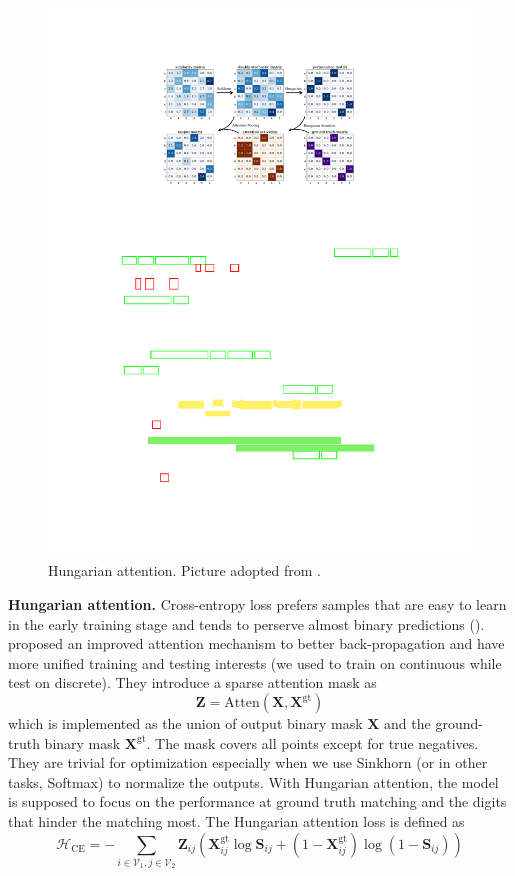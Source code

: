 \documentclass[a4paper]{article}
\begin{document}
\begin{figure}[htbp]
    \centering
    \includegraphics[width=0.5\linewidth]{Images/hungarian.pdf}
    \caption{Hungarian attention. Picture adopted from \cite{cie}.}
\end{figure}
\textbf{Hungarian attention.}
Cross-entropy loss prefers samples that are easy to learn in the early training stage and tends to perserve almost binary predictions (\cite{cie}). \cite{cie} proposed an improved attention mechanism to better back-propagation and have more unified training and testing interests (we used to train on continuous while test on discrete). They introduce a sparse attention mask as 
$$
\mathbf{Z} = \mathrm{Atten} \left(\mathbf{X}, \mathbf{X}^{\mathrm{gt}}\right)
$$
which is implemented as the union of output binary mask $\mathbf{X}$ and the ground-truth binary mask $\mathbf{X}^{\mathrm{gt}}$. The mask covers all points except for true negatives. They are trivial for optimization especially when we use Sinkhorn (or in other tasks, Softmax) to normalize the outputs. With Hungarian attention, the model is supposed to focus on the performance at ground truth matching and the digits that hinder the matching most. The Hungarian attention loss is defined as 
$$
\mathcal{H}_{\mathrm{CE}} = -\sum_{i\in \mathcal{V}_1, j\in \mathcal{V}_2 } \mathbf{Z}_{ij} \left(\mathbf{X}_{ij}^{\mathrm{gt}} \log\mathbf{S}_{ij} + \left(1-\mathbf{X}_{ij}^{\mathrm{gt}}\right) \log \left(1- \mathbf{S}_{ij}\right) \right)
$$
\end{document}
